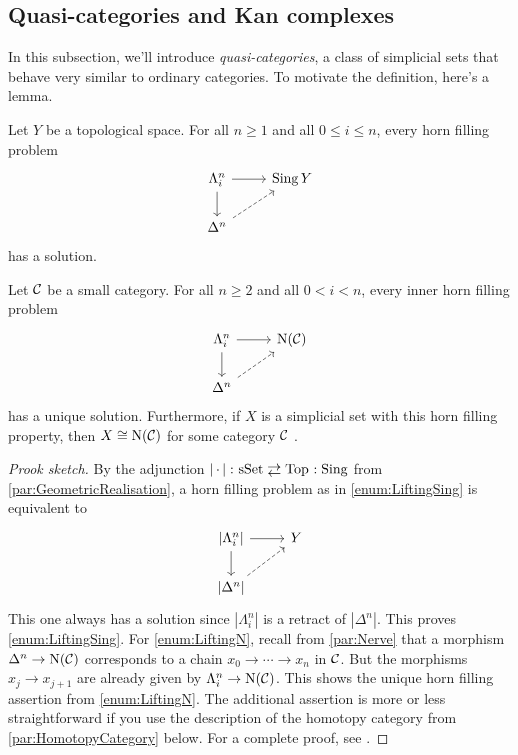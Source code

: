 \subsection{Quasi-categories and Kan complexes}
In this subsection, we'll introduce \emph{quasi-categories}, a class of simplicial sets that behave very similar to ordinary categories. To motivate the definition, here's a lemma.
\begin{lem}\label{lem:LiftingConditions}
	\begin{alphanumerate}
		\item Let $Y$ be a topological space. For all $n\geqslant 1$ and all $0\leqslant i\leqslant n$, every horn filling problem\label{enum:LiftingSing}
		\begin{equation*}
			\begin{tikzcd}
				\Lambda_i^n\rar\dar & \Sing Y\\
				\Delta^n\urar[dashed]
			\end{tikzcd}
		\end{equation*}
		has a solution.
		\item Let $\mathcal{C}$ be a small category. For all $n\geqslant 2$ and all $0<i<n$, every inner horn filling problem\label{enum:LiftingN}
		\begin{equation*}
			\begin{tikzcd}
				\Lambda_i^n\rar\dar & \N(\Cc)\\
				\Delta^n\urar[dashed]
			\end{tikzcd}
		\end{equation*}
		has a unique solution. Furthermore, if $X$ is a simplicial set with this horn filling property, then $X\cong \operatorname{N}(\mathcal{C})$ for some category $\mathcal{C}$ .
	\end{alphanumerate}
\end{lem}
\begin{proof}[Prook sketch]
	By the adjunction $\left|\,\cdot\,\right|\colon \cat{sSet}\shortdoublelrmorphism\cat{Top}\noloc \Sing$ from \cref{par:GeometricRealisation}, a horn filling problem as in \cref{enum:LiftingSing} is equivalent to
	\begin{equation*}
		\begin{tikzcd}
			\left|\Lambda_i^n\right|\rar\dar & Y\\
			\left|\Delta^n\right|\urar[dashed]
		\end{tikzcd}
	\end{equation*}
	This one always has a solution since $\left|\Lambda_i^n\right|$ is a retract of $\left|\Delta^n\right|$. This proves \cref{enum:LiftingSing}. For \cref{enum:LiftingN}, recall from \cref{par:Nerve} that a morphism $\Delta^n\rightarrow \operatorname{N}(\mathcal{C})$ corresponds to a chain $x_0\rightarrow \dotsb\rightarrow x_n$ in $\mathcal{C}$. But the morphisms $x_j\rightarrow x_{j+1}$ are already given by $\Lambda_i^n\rightarrow \operatorname{N}(\mathcal{C})$. This shows the unique horn filling assertion from \cref{enum:LiftingN}. The additional assertion is more or less straightforward if you use the description of the homotopy category from \cref{par:HomotopyCategory} below. For a complete proof, see \cite[Theorem~II.25]{HigherCatsI}.
\end{proof}
